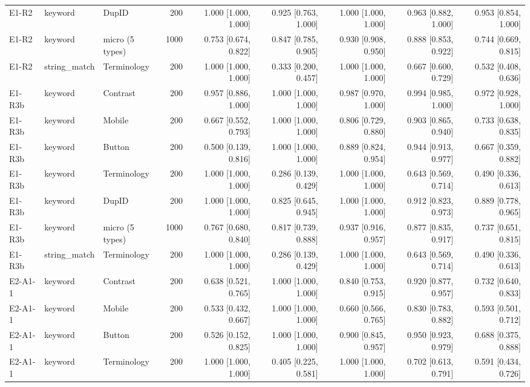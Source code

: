 \begin{table}[t]
\begin{tabular}{lllrrrrrr}
E1-R2 & keyword & DupID & 200 & 1.000 [1.000, 1.000] & 0.925 [0.763, 1.000] & 1.000 [1.000, 1.000] & 0.963 [0.882, 1.000] & 0.953 [0.854, 1.000] \\
E1-R2 & keyword & micro (5 types) & 1000 & 0.753 [0.674, 0.822] & 0.847 [0.785, 0.905] & 0.930 [0.908, 0.950] & 0.888 [0.853, 0.922] & 0.744 [0.669, 0.815] \\
E1-R2 & string\_match & Terminology & 200 & 1.000 [1.000, 1.000] & 0.333 [0.200, 0.457] & 1.000 [1.000, 1.000] & 0.667 [0.600, 0.729] & 0.532 [0.408, 0.636] \\
E1-R3b & keyword & Contrast & 200 & 0.957 [0.886, 1.000] & 1.000 [1.000, 1.000] & 0.987 [0.970, 1.000] & 0.994 [0.985, 1.000] & 0.972 [0.928, 1.000] \\
E1-R3b & keyword & Mobile & 200 & 0.667 [0.552, 0.793] & 1.000 [1.000, 1.000] & 0.806 [0.729, 0.880] & 0.903 [0.865, 0.940] & 0.733 [0.638, 0.835] \\
E1-R3b & keyword & Button & 200 & 0.500 [0.139, 0.816] & 1.000 [1.000, 1.000] & 0.889 [0.824, 0.954] & 0.944 [0.913, 0.977] & 0.667 [0.359, 0.882] \\
E1-R3b & keyword & Terminology & 200 & 1.000 [1.000, 1.000] & 0.286 [0.139, 0.429] & 1.000 [1.000, 1.000] & 0.643 [0.569, 0.714] & 0.490 [0.336, 0.613] \\
E1-R3b & keyword & DupID & 200 & 1.000 [1.000, 1.000] & 0.825 [0.645, 0.945] & 1.000 [1.000, 1.000] & 0.912 [0.823, 0.973] & 0.889 [0.778, 0.965] \\
E1-R3b & keyword & micro (5 types) & 1000 & 0.767 [0.680, 0.840] & 0.817 [0.739, 0.888] & 0.937 [0.916, 0.957] & 0.877 [0.835, 0.917] & 0.737 [0.651, 0.815] \\
E1-R3b & string\_match & Terminology & 200 & 1.000 [1.000, 1.000] & 0.286 [0.139, 0.429] & 1.000 [1.000, 1.000] & 0.643 [0.569, 0.714] & 0.490 [0.336, 0.613] \\
E2-A1-1 & keyword & Contrast & 200 & 0.638 [0.521, 0.765] & 1.000 [1.000, 1.000] & 0.840 [0.753, 0.915] & 0.920 [0.877, 0.957] & 0.732 [0.640, 0.833] \\
E2-A1-1 & keyword & Mobile & 200 & 0.533 [0.432, 0.667] & 1.000 [1.000, 1.000] & 0.660 [0.566, 0.765] & 0.830 [0.783, 0.882] & 0.593 [0.501, 0.712] \\
E2-A1-1 & keyword & Button & 200 & 0.526 [0.152, 0.825] & 1.000 [1.000, 1.000] & 0.900 [0.845, 0.957] & 0.950 [0.923, 0.979] & 0.688 [0.375, 0.888] \\
E2-A1-1 & keyword & Terminology & 200 & 1.000 [1.000, 1.000] & 0.405 [0.225, 0.581] & 1.000 [1.000, 1.000] & 0.702 [0.613, 0.791] & 0.591 [0.434, 0.726] \\

\end{tabular}
\end{table}
